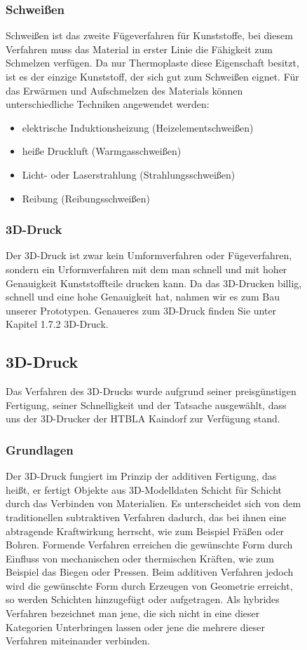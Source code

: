 \begin{figure}
\subsubsection{Schweißen}
Schweißen ist das zweite Fügeverfahren für Kunststoffe, bei diesem Verfahren muss das Material in erster Linie die
Fähigkeit zum Schmelzen verfügen. Da nur Thermoplaste diese Eigenschaft besitzt, ist es der einzige Kunststoff, der sich gut
zum Schweißen eignet. Für das Erwärmen und Aufschmelzen des Materials können unterschiedliche Techniken angewendet werden:
\begin{itemize}
    \item elektrische Induktionsheizung (Heizelementschweißen)
    \item heiße Druckluft (Warmgasschweißen)
    \item Licht- oder Laserstrahlung (Strahlungsschweißen)
    \item Reibung (Reibungsschweißen)
\end{itemize}

\subsubsection{3D-Druck}
Der 3D-Druck ist zwar kein Umformverfahren oder Fügeverfahren, sondern ein Urformverfahren mit dem man schnell und mit hoher Genauigkeit Kunststoffteile
drucken kann. Da das 3D-Drucken billig, schnell und eine hohe Genauigkeit hat, nahmen wir es zum Bau unserer Prototypen. Genaueres zum 3D-Druck finden
Sie unter Kapitel 1.7.2 3D-Druck.

\subsection{3D-Druck}
Das Verfahren des 3D-Drucks wurde aufgrund seiner preisgünstigen Fertigung, seiner Schnelligkeit und der Tatsache
ausgewählt, dass uns der 3D-Drucker der HTBLA Kaindorf zur Verfügung stand.
\subsubsection{Grundlagen}
Der 3D-Druck fungiert im Prinzip der additiven Fertigung, das heißt, er fertigt Objekte aus 3D-Modelldaten Schicht für Schicht
durch das Verbinden von Materialien. Es unterscheidet sich von dem traditionellen subtraktiven Verfahren dadurch,
das bei ihnen eine abtragende Kraftwirkung herrscht, wie zum Beispiel Fräßen oder Bohren. Formende Verfahren
erreichen die gewünschte Form durch Einfluss von mechanischen oder thermischen Kräften, wie zum Beispiel das Biegen oder
Pressen. Beim additiven  Verfahren jedoch wird die gewünschte Form durch Erzeugen von Geometrie erreicht, so werden Schichten
hinzugefügt oder aufgetragen. Als hybrides Verfahren bezeichnet man jene, die sich nicht in eine dieser Kategorien
Unterbringen lassen oder jene die mehrere dieser Verfahren miteinander verbinden.


\end{figure}
